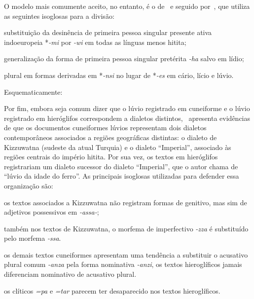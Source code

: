 \vspace{3pt}
\begin{center}
\end{center}

O modelo mais comumente aceito, no entanto, é o de~\citet[92]{Oettinger1978} e
seguido por~\citet[6]{Yakubovich2010}, que utiliza as seguintes isoglosas para a
divisão:
\begin{inparaenum}
	\item substituição da desinência de primeira pessoa singular presente ativa
	indoeuropeia *\emph{-mi} por \emph{-wi} em todas as línguas menos hitita;
	\item generalização da forma de primeira pessoa singular pretérita \emph{-ha}
	salvo em lídio;
	\item plural em formas derivadas em *\emph{-nsi} no lugar de *\emph{-es} em
	cário, lício e lúvio.
\end{inparaenum}
Esquematicamente:

\begin{center}
\end{center}

Por fim, embora seja comum dizer que o lúvio registrado em cuneiforme e o
lúvio registrado em hieróglifos correspondem a dialetos
distintos,~\citet{Yakubovich2010} apresenta evidências de que os
documentos cuneiformes lúvios representam dois dialetos contemporâneos
associados a regiões geográficas distintas: o dialeto de Kizzuwatna (sudeste da
atual Turquia) e o dialeto ``Imperial'', associado às regiões centrais do
império hitita.
Por sua vez, os textos em hieróglifos registrariam um dialeto sucessor do
dialeto ``Imperial'', que o autor chama de ``lúvio da idade do ferro''.
As principais isoglosas utilizadas para defender essa organização são:
\begin{inparaenum}
	\item os textos associados a Kizzuwatna não registram formas de genitivo, mas
	sim de adjetivos possessivos em \emph{-assa-};
	\item também nos textos de Kizzuwatna, o morfema de imperfectivo \emph{-zza}
	é substituído pelo morfema \emph{-ssa}.
	\item os demais textos cuneiformes apresentam uma tendência a substituir o
	acusativo plural comum \emph{-anza} pela forma nominativa \emph{-anzi},
	os textos hieroglíficos jamais diferenciam nominativo de acusativo plural.
	\item os clíticos \emph{=pa} e \emph{=tar} parecem ter desaparecido nos textos
	hieroglíficos.
\end{inparaenum}



